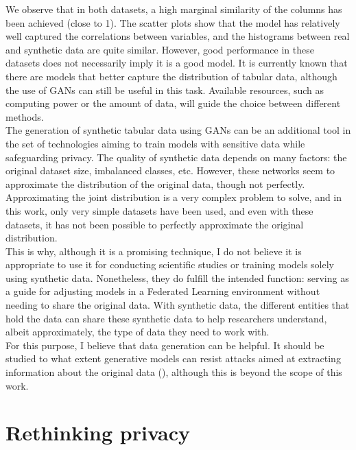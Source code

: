 We observe that in both datasets, a high marginal similarity of the columns has been achieved (close to 1). The scatter plots show that the model has relatively well captured the correlations between variables, and the histograms between real and synthetic data are quite similar. However, good performance in these datasets does not necessarily imply it is a good model. It is currently known that there are models that better capture the distribution of tabular data, although the use of GANs can still be useful in this task. Available resources, such as computing power or the amount of data, will guide the choice between different methods.\\
The generation of synthetic tabular data using GANs can be an additional tool in the set of technologies aiming to train models with sensitive data while safeguarding privacy. The quality of synthetic data depends on many factors: the original dataset size, imbalanced classes, etc. However, these networks seem to approximate the distribution of the original data, though not perfectly. Approximating the joint distribution is a very complex problem to solve, and in this work, only very simple datasets have been used, and even with these datasets, it has not been possible to perfectly approximate the original distribution.\\
This is why, although it is a promising technique, I do not believe it is appropriate to use it for conducting scientific studies or training models solely using synthetic data. Nonetheless, they do fulfill the intended function: serving as a guide for adjusting models in a Federated Learning environment without needing to share the original data. With synthetic data, the different entities that hold the data can share these synthetic data to help researchers understand, albeit approximately, the type of data they need to work with.\\
For this purpose, I believe that data generation can be helpful. It should be studied to what extent generative models can resist attacks aimed at extracting information about the original data (\cite*{sun2023}), although this is beyond the scope of this work.

\section{Rethinking privacy}

